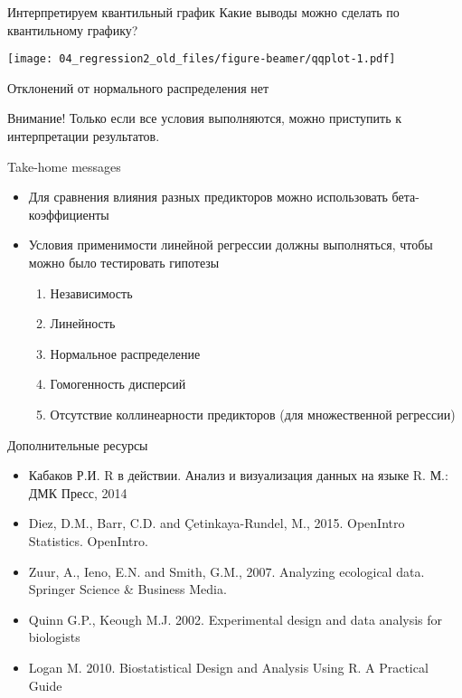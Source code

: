\documentclass[
  ignorenonframetext,
  t,xcolor=table]{beamer}
\providecommand{\tightlist}{%
  \setlength{\itemsep}{0pt}\setlength{\parskip}{0pt}}
\begin{document}
\begin{frame}{Интерпретируем квантильный график}
\protect\hypertarget{ux438ux43dux442ux435ux440ux43fux440ux435ux442ux438ux440ux443ux435ux43c-ux43aux432ux430ux43dux442ux438ux43bux44cux43dux44bux439-ux433ux440ux430ux444ux438ux43a}{}
Какие выводы можно сделать по квантильному графику?

\texttt{[image: 04\_regression2\_old\_files/figure-beamer/qqplot-1.pdf]}
\pause

Отклонений от нормального распределения нет
\end{frame}

\begin{frame}{Внимание!}
\protect\hypertarget{ux432ux43dux438ux43cux430ux43dux438ux435}{}
Только если все условия выполняются, можно приступить к интерпретации
результатов.
\end{frame}

\begin{frame}{Take-home messages}
\protect\hypertarget{take-home-messages}{}
\begin{itemize}
\tightlist
\item
  Для сравнения влияния разных предикторов можно использовать
  бета-коэффициенты
\item
  Условия применимости линейной регрессии должны выполняться, чтобы
  можно было тестировать гипотезы

  \begin{enumerate}
  \tightlist
  \item
    Независимость
  \item
    Линейность
  \item
    Нормальное распределение
  \item
    Гомогенность дисперсий
  \item
    Отсутствие коллинеарности предикторов (для множественной регрессии)
  \end{enumerate}
\end{itemize}
\end{frame}

\begin{frame}{Дополнительные ресурсы}
\protect\hypertarget{ux434ux43eux43fux43eux43bux43dux438ux442ux435ux43bux44cux43dux44bux435-ux440ux435ux441ux443ux440ux441ux44b}{}
\begin{itemize}
\tightlist
\item
  Кабаков Р.И. R в действии. Анализ и визуализация данных на языке R.
  М.: ДМК Пресс, 2014
\item
  Diez, D.M., Barr, C.D. and Çetinkaya-Rundel, M., 2015. OpenIntro
  Statistics. OpenIntro.
\item
  Zuur, A., Ieno, E.N. and Smith, G.M., 2007. Analyzing ecological data.
  Springer Science \& Business Media.
\item
  Quinn G.P., Keough M.J. 2002. Experimental design and data analysis
  for biologists
\item
  Logan M. 2010. Biostatistical Design and Analysis Using R. A Practical
  Guide
\end{itemize}
\end{frame}
\end{document}

